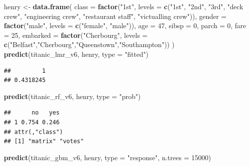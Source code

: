 \documentclass[12pt,]{krantz}
\newenvironment{Shaded}{\begin{snugshade}}{\end{snugshade}}
\newcommand{\DataTypeTok}[1]{\textcolor[rgb]{0.13,0.29,0.53}{#1}}
\newcommand{\DecValTok}[1]{\textcolor[rgb]{0.00,0.00,0.81}{#1}}
\newcommand{\KeywordTok}[1]{\textcolor[rgb]{0.13,0.29,0.53}{\textbf{#1}}}
\newcommand{\NormalTok}[1]{#1}
\newcommand{\StringTok}[1]{\textcolor[rgb]{0.31,0.60,0.02}{#1}}
\begin{document}
\begin{Shaded}
\begin{Highlighting}[]
\NormalTok{henry <-}\StringTok{ }\KeywordTok{data.frame}\NormalTok{(}
            \DataTypeTok{class =} \KeywordTok{factor}\NormalTok{(}\StringTok{"1st"}\NormalTok{, }\DataTypeTok{levels =} \KeywordTok{c}\NormalTok{(}\StringTok{"1st"}\NormalTok{, }\StringTok{"2nd"}\NormalTok{, }\StringTok{"3rd"}\NormalTok{, }\StringTok{"deck crew"}\NormalTok{, }\StringTok{"engineering crew"}\NormalTok{, }\StringTok{"restaurant staff"}\NormalTok{, }\StringTok{"victualling crew"}\NormalTok{)),}
            \DataTypeTok{gender =} \KeywordTok{factor}\NormalTok{(}\StringTok{"male"}\NormalTok{, }\DataTypeTok{levels =} \KeywordTok{c}\NormalTok{(}\StringTok{"female"}\NormalTok{, }\StringTok{"male"}\NormalTok{)),}
            \DataTypeTok{age =} \DecValTok{47}\NormalTok{,}
            \DataTypeTok{sibsp =} \DecValTok{0}\NormalTok{,}
            \DataTypeTok{parch =} \DecValTok{0}\NormalTok{,}
            \DataTypeTok{fare =} \DecValTok{25}\NormalTok{,}
            \DataTypeTok{embarked =} \KeywordTok{factor}\NormalTok{(}\StringTok{"Cherbourg"}\NormalTok{, }\DataTypeTok{levels =} \KeywordTok{c}\NormalTok{(}\StringTok{"Belfast"}\NormalTok{,}\StringTok{"Cherbourg"}\NormalTok{,}\StringTok{"Queenstown"}\NormalTok{,}\StringTok{"Southampton"}\NormalTok{))}
\NormalTok{)}
\KeywordTok{predict}\NormalTok{(titanic_lmr_v6, henry, }\DataTypeTok{type =} \StringTok{"fitted"}\NormalTok{)}
\end{Highlighting}
\end{Shaded}

\begin{verbatim}
##         1 
## 0.4318245
\end{verbatim}

\begin{Shaded}
\begin{Highlighting}[]
\KeywordTok{predict}\NormalTok{(titanic_rf_v6, henry, }\DataTypeTok{type =} \StringTok{"prob"}\NormalTok{)}
\end{Highlighting}
\end{Shaded}

\begin{verbatim}
##      no   yes
## 1 0.754 0.246
## attr(,"class")
## [1] "matrix" "votes"
\end{verbatim}

\begin{Shaded}
\begin{Highlighting}[]
\KeywordTok{predict}\NormalTok{(titanic_gbm_v6, henry, }\DataTypeTok{type =} \StringTok{"response"}\NormalTok{, }\DataTypeTok{n.trees =} \DecValTok{15000}\NormalTok{)}
\end{Highlighting}
\end{Shaded}
\end{document}
